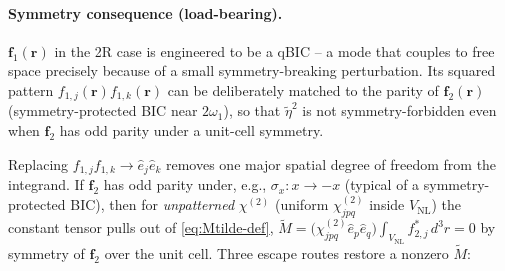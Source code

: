 \documentclass[11pt,a4paper]{article}
\newcommand{\bvec}[1]{\mathbf{#1}}
\newcommand{\f}{\bvec{f}}
\newcommand{\ri}{\bvec{r}}
\newcommand{\chitwo}{\chi^{(2)}}
\newcommand{\VNL}{V_{\text{NL}}}
\begin{document}
\paragraph{Symmetry consequence (load-bearing).}
$\f_1(\ri)$ in the 2R case is engineered to be a qBIC -- a mode that
couples to free space precisely because of a small symmetry-breaking
perturbation.  Its squared pattern $f_{1,j}(\ri)f_{1,k}(\ri)$ can be
deliberately matched to the parity of $\f_2(\ri)$ (symmetry-protected BIC
near $2\omega_1$), so that $\widetilde\eta^{2}$ is not symmetry-forbidden
even when $\f_2$ has odd parity under a unit-cell symmetry.

Replacing $f_{1,j}f_{1,k}\to\hat e_j\hat e_k$ removes one major spatial
degree of freedom from the integrand.  If $\f_2$ has odd parity under,
e.g., $\sigma_x:x\to-x$ (typical of a symmetry-protected BIC), then for
\emph{unpatterned} $\chitwo$ (uniform $\chitwo_{jpq}$ inside $\VNL$) the
constant tensor pulls out of \eqref{eq:Mtilde-def},
$\widetilde M=\bigl(\chitwo_{jpq}\hat e_p\hat e_q\bigr)\!\int_{\VNL}\!
f_{2,j}^{*}\,d^{3}r=0$ by symmetry of $\f_2$ over the unit cell.  Three escape routes
restore a nonzero $\widetilde M$:
\end{document}
